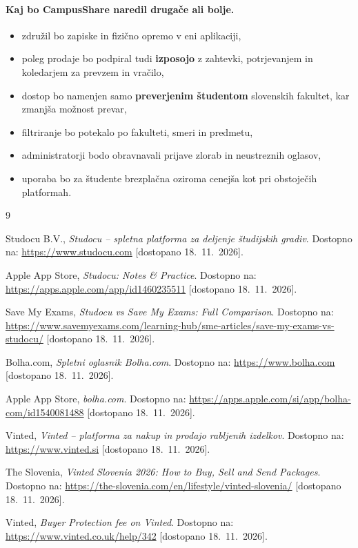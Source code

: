\documentclass[12pt,a4paper]{article}
\begin{document}
\paragraph{Kaj bo CampusShare naredil drugače ali bolje.}
\begin{itemize}[noitemsep]
    \item združil bo zapiske in fizično opremo v eni aplikaciji,
    \item poleg prodaje bo podpiral tudi \textbf{izposojo} z zahtevki,
          potrjevanjem in koledarjem za prevzem in vračilo,
    \item dostop bo namenjen samo \textbf{preverjenim študentom} slovenskih
          fakultet, kar zmanjša možnost prevar,
    \item filtriranje bo potekalo po fakulteti, smeri in predmetu,
    \item administratorji bodo obravnavali prijave zlorab in neustreznih
          oglasov,
    \item uporaba bo za študente brezplačna oziroma cenejša kot pri
          obstoječih platformah.
\end{itemize}


\begin{thebibliography}{9}


Studocu B.V., \emph{Studocu -- spletna platforma za deljenje študijskih
gradiv}. Dostopno na: \url{https://www.studocu.com} [dostopano 18.~11.~2026].

Apple App Store, \emph{Studocu: Notes \& Practice}. Dostopno na:
\url{https://apps.apple.com/app/id1460235511} [dostopano 18.~11.~2026].

Save My Exams, \emph{Studocu vs Save My Exams: Full Comparison}. Dostopno na:
\url{https://www.savemyexams.com/learning-hub/sme-articles/save-my-exams-vs-studocu/}
[dostopano 18.~11.~2026].

Bolha.com, \emph{Spletni oglasnik Bolha.com}. Dostopno na:
\url{https://www.bolha.com} [dostopano 18.~11.~2026].

Apple App Store, \emph{bolha.com}. Dostopno na:
\url{https://apps.apple.com/si/app/bolha-com/id1540081488}
[dostopano 18.~11.~2026].

Vinted, \emph{Vinted -- platforma za nakup in prodajo rabljenih izdelkov}.
Dostopno na: \url{https://www.vinted.si} [dostopano 18.~11.~2026].

The Slovenia, \emph{Vinted Slovenia 2026: How to Buy, Sell and Send
Packages}. Dostopno na: \url{https://the-slovenia.com/en/lifestyle/vinted-slovenia/}
[dostopano 18.~11.~2026].

Vinted, \emph{Buyer Protection fee on Vinted}. Dostopno na:
\url{https://www.vinted.co.uk/help/342} [dostopano 18.~11.~2026].

\end{thebibliography}
\end{document}
